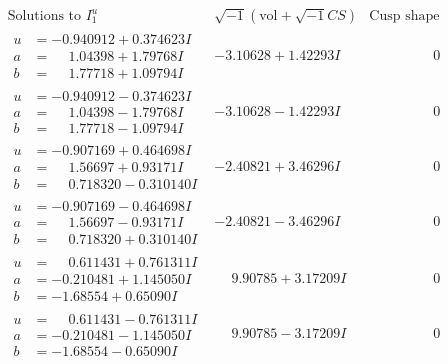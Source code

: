 \documentclass[1p]{elsarticle_modified}
\theoremstyle{definition}
\newcommand{\I}{\sqrt{-1}}
\begin{document}
$$\begin{array}{c|c|c}  
\text{Solutions to }I^u_{1}& \I (\text{vol} + \sqrt{-1}CS) & \text{Cusp shape}\\
 \hline 
\begin{aligned}
u &= -0.940912 + 0.374623 I \\
a &= \phantom{-}1.04398 + 1.79768 I \\
b &= \phantom{-}1.77718 + 1.09794 I\end{aligned}
 & -3.10628 + 1.42293 I & \phantom{-0.000000 } 0 \\ \hline\begin{aligned}
u &= -0.940912 - 0.374623 I \\
a &= \phantom{-}1.04398 - 1.79768 I \\
b &= \phantom{-}1.77718 - 1.09794 I\end{aligned}
 & -3.10628 - 1.42293 I & \phantom{-0.000000 } 0 \\ \hline\begin{aligned}
u &= -0.907169 + 0.464698 I \\
a &= \phantom{-}1.56697 + 0.93171 I \\
b &= \phantom{-}0.718320 - 0.310140 I\end{aligned}
 & -2.40821 + 3.46296 I & \phantom{-0.000000 } 0 \\ \hline\begin{aligned}
u &= -0.907169 - 0.464698 I \\
a &= \phantom{-}1.56697 - 0.93171 I \\
b &= \phantom{-}0.718320 + 0.310140 I\end{aligned}
 & -2.40821 - 3.46296 I & \phantom{-0.000000 } 0 \\ \hline\begin{aligned}
u &= \phantom{-}0.611431 + 0.761311 I \\
a &= -0.210481 + 1.145050 I \\
b &= -1.68554 + 0.65090 I\end{aligned}
 & \phantom{-}9.90785 + 3.17209 I & \phantom{-0.000000 } 0 \\ \hline\begin{aligned}
u &= \phantom{-}0.611431 - 0.761311 I \\
a &= -0.210481 - 1.145050 I \\
b &= -1.68554 - 0.65090 I\end{aligned}
 & \phantom{-}9.90785 - 3.17209 I & \phantom{-0.000000 } 0 \\ \hline\begin{aligned}

\end{aligned}
\end{array}$$
\end{document}
